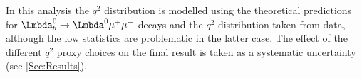 
In this analysis the $q^{2}$ distribution is modelled using the theoretical predictions for $\Lb\to\PLambda^{0}\mup\mun$ decays and the $q^{2}$ distribution taken from \LbK data, although the low statistics are problematic in the latter case. The effect of the different $q^{2}$ proxy choices on the final result is taken as a systematic uncertainty (see \autoref{Sec:Results}).







